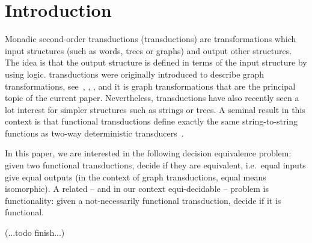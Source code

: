 \section{Introduction}
Monadic second-order transductions (\mso transductions) are transformations which input structures (such as words, trees or graphs) and output other structures. The idea is that the output structure is defined in terms of the input structure by using \mso logic. \mso transductions were originally introduced to describe graph transformations, see~\cite[p.~43]{arnborgLagergrenSeese1988}, \cite[Definition 6]{engelfriet1991}, \cite[Defintion 2.2]{courcelle1991}, and it is graph transformations that are the principal topic of the current paper. Nevertheless, \mso transductions have also recently seen a lot interest for simpler structures such as strings or trees. A seminal result in this context is that functional \mso transductions  define exactly the same string-to-string functions as two-way deterministic transducers~\cite{engelfrietMSODefinableString2001}. 

In this paper, we are interested in the following decision equivalence problem: given two functional transductions, decide if they are equivalent, i.e.~equal inputs give equal outputs (in the context of graph transductions, equal means isomorphic). A related -- and in our context equi-decidable -- problem is functionality: given a not-necessarily functional transduction, decide if it is functional. 

(...todo finish...)





